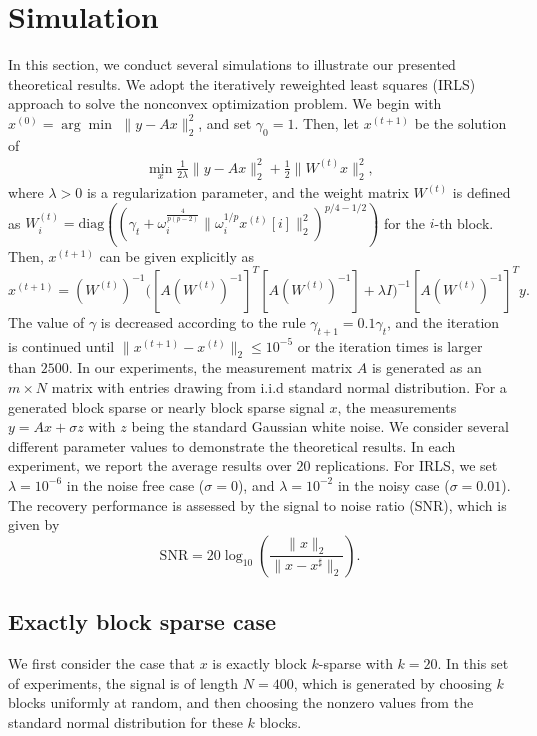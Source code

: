 \documentclass[11pt]{article}
\begin{document}
\section{Simulation}
In this section, we conduct several simulations to illustrate our presented theoretical results. We adopt the iteratively reweighted least squares (IRLS) approach to solve the nonconvex optimization problem. We begin with $x^{(0)}=\arg\min\,\,\lVert y-Ax\rVert_2^2$, and set $\gamma_0=1$. Then, let $x^{(t+1)}$ be the solution of \begin{align}
\min\limits_{x}\frac{1}{2\lambda}\lVert y-Ax\rVert_2^2+\frac{1}{2}\lVert W^{(t)}x\rVert_2^2,
\end{align}
where $\lambda>0$ is a regularization parameter, and the weight matrix $W^{(t)}$ is defined as $W_i^{(t)}=\mathrm{diag}((\gamma_t+\omega_i^{\frac{4}{p(p-2)}}\lVert \omega_i^{1/p}x^{(t)}[i]\rVert_2^2)^{p/4-1/2})$ for the $i$-th block. Then, $x^{(t+1)}$ can be given explicitly as $$
x^{(t+1)}=(W^{(t)})^{-1}\Big([A(W^{(t)})^{-1}]^T[A(W^{(t)})^{-1}]+\lambda I\Big)^{-1}[A(W^{(t)})^{-1}]^T y.
$$
The value of $\gamma$ is decreased according to the rule $\gamma_{t+1}=0.1\gamma_{t}$, and the iteration is continued until $\lVert x^{(t+1)}-x^{(t)}\rVert_2\leq 10^{-5}$ or the iteration times is larger than $2500$. In our experiments, the measurement matrix $A$ is generated as an $m\times N$ matrix with entries drawing from i.i.d standard normal distribution. For a generated block sparse or nearly block sparse signal $x$, the measurements $y=Ax+\sigma z$ with $z$ being the standard Gaussian white noise. We consider several different parameter values to demonstrate the theoretical results. In each experiment, we report the average results over $20$ replications. For IRLS, we set $\lambda=10^{-6}$ in the noise free case ($\sigma=0$), and $\lambda=10^{-2}$ in the noisy case ($\sigma=0.01$). The recovery performance is assessed by the signal to noise ratio (SNR), which is given by $$
\mathrm{SNR}=20\log_{10}\left(\frac{\lVert x\rVert_2}{\lVert x-x^{\sharp}\rVert_2}\right).
$$

\subsection{Exactly block sparse case}
We first consider the case that $x$ is exactly block $k$-sparse with $k=20$. In this set of experiments, the signal is of length $N=400$, which is generated by choosing $k$ blocks uniformly at random, and then choosing the nonzero values from the standard normal distribution for these $k$ blocks.
\end{document}
